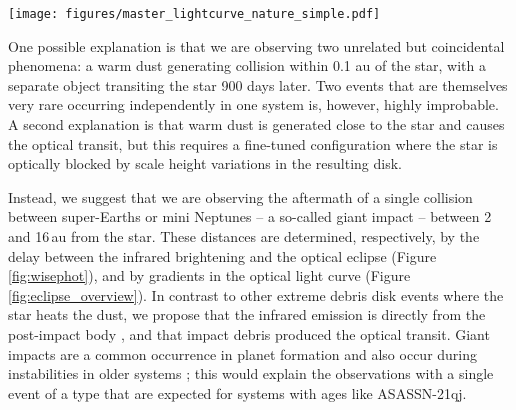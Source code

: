 \documentclass[sn-nature,oneside]{sn-jnl}%
\newcommand{\asas}{ASASSN-21qj}
\begin{document}
\begin{figure*}
\begin{centering}
\texttt{[image: figures/master\_lightcurve\_nature\_simple.pdf]}
      \caption{\textbf{The light curve of ASASSN-21qj from several different photometric surveys and the derived transverse velocities.}
      {\bf a},The eclipse depth is deeper for shorter wavelengths, indicating that the transiting material is dominated by sub-micron sized grains.
      {\bf b},Transverse velocities derived from the light-curve gradients.
      These are lower limits to the true velocity, and thus imply that the transiting material is closer to the star than 16\,au.
      Error bars are shown at $1\sigma$ confidence.
      }
        \label{fig:eclipse_overview}
\end{centering}
\end{figure*}





One possible explanation is that we are observing two unrelated but coincidental phenomena: a warm dust generating collision within 0.1 au of the star, with a separate object transiting the star 900 days later.
%
Two events that are themselves very rare occurring independently in one system is, however, highly improbable.
%
A second explanation is that warm dust is generated close to the star and causes the optical transit, but this requires a fine-tuned configuration where the star is optically blocked by scale height variations in the resulting disk.

Instead, we suggest that we are observing the aftermath of a single collision between super-Earths or mini Neptunes -- a so-called giant impact -- between 2 and 16\,au from the star. 
%
These distances are determined, respectively, by the delay between the infrared brightening and the optical eclipse (Figure \ref{fig:wisephot}), and by gradients in the optical light curve (Figure \ref{fig:eclipse_overview}).
%
In contrast to other extreme debris disk events where the star heats the dust, we propose that the infrared emission is directly from the post-impact body \cite{Lock2017,2009ApJ...704..770M}, and that impact debris produced the optical transit.
%
Giant impacts are a common occurrence in planet formation \cite{Schlichting2018a,DAngelo2018} and also occur during instabilities in older systems \cite{Kaib2016}; this would explain the observations with a single event of a type that are expected for systems with ages like \asas{}.
\end{document}
